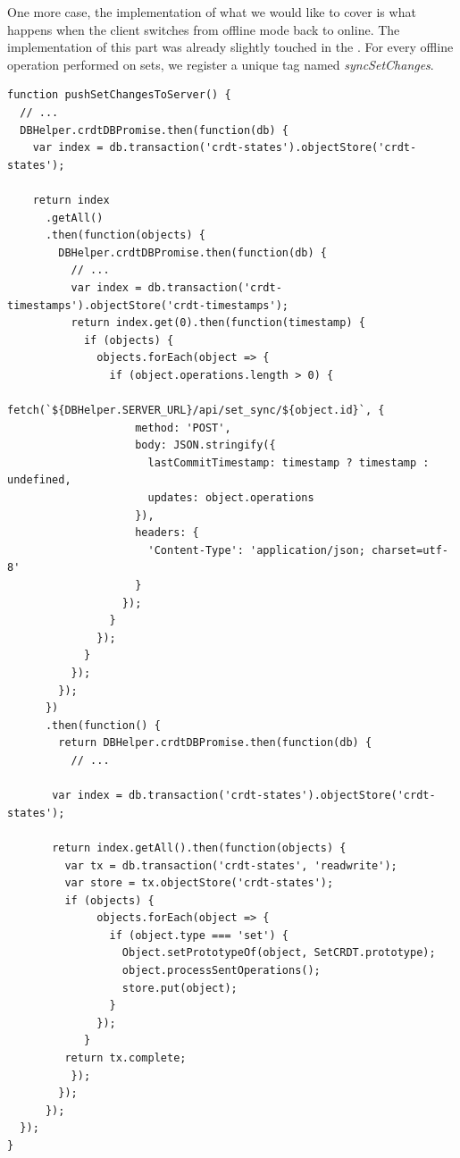 One more case, the implementation of what we would like to cover is what happens when the client switches from offline mode back to online. The implementation of this part was already slightly touched in the . For every offline operation performed on sets, we register a unique tag named \textit{syncSetChanges}.

\begin{lstlisting}[caption={A function \textit{pushSetChangesToServer} triggered every time when a client re-connects to the network.}, label={lst:dev12}]
function pushSetChangesToServer() {
  // ...
  DBHelper.crdtDBPromise.then(function(db) {
    var index = db.transaction('crdt-states').objectStore('crdt-states');

    return index
      .getAll()
      .then(function(objects) {
        DBHelper.crdtDBPromise.then(function(db) {
          // ...
          var index = db.transaction('crdt-timestamps').objectStore('crdt-timestamps');
          return index.get(0).then(function(timestamp) {
            if (objects) {
              objects.forEach(object => {
                if (object.operations.length > 0) {
                  fetch(`${DBHelper.SERVER_URL}/api/set_sync/${object.id}`, {
                    method: 'POST',
                    body: JSON.stringify({
                      lastCommitTimestamp: timestamp ? timestamp : undefined,
                      updates: object.operations
                    }),
                    headers: {
                      'Content-Type': 'application/json; charset=utf-8'
                    }
                  });
                }
              });
            }
          });
        });
      })
      .then(function() {
        return DBHelper.crdtDBPromise.then(function(db) {
          // ...

       var index = db.transaction('crdt-states').objectStore('crdt-states');

       return index.getAll().then(function(objects) {
         var tx = db.transaction('crdt-states', 'readwrite');
         var store = tx.objectStore('crdt-states');
         if (objects) {
              objects.forEach(object => {
                if (object.type === 'set') {
                  Object.setPrototypeOf(object, SetCRDT.prototype);
                  object.processSentOperations();
                  store.put(object);
                }
              });
            }
         return tx.complete;
          });
        });
      });
  });
}
\end{lstlisting}

